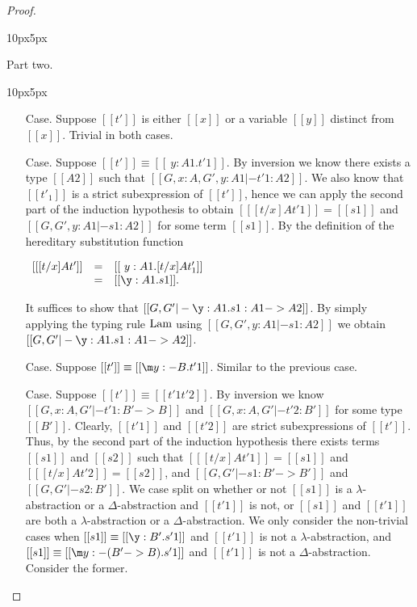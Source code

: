 \begin{proof}
\begin{changemargin}{10px}{5px}
\begin{itemize}
  \end{itemize}
  \end{changemargin}
  
  \noindent Part two.
  \vspace{-25px}
  \begin{changemargin}{10px}{5px}\noindent
  \begin{itemize}
  \item[Case.] Suppose $[[t']]$ is either $[[x]]$ or a variable $[[y]]$ distinct from $[[x]]$.  
    Trivial in both cases.

  \item[Case.] Suppose $[[t']] \equiv [[\ y:A1.t'1]]$.  By inversion 
    we know there exists a type $[[A2]]$ such that
    $[[G,x:A,G',y:A1 |- t'1:A2]]$.
    We also know that $[[t'_1]]$ is a strict subexpression of $[[t']]$, hence we can apply the second part of the
    induction hypothesis to obtain
    $[[ [t/x] A t'1]] = [[s1]]$ and $[[G,G',y:A1 |- s1:A2]]$
    for some term $[[s1]]$.  By the definition of the hereditary substitution function 
    \begin{center}
      \begin{math}
        \begin{array}{lll}
          [[ [t/x] A t']] & = & [[\ y:A1.[t/x] A t'_1]] \\
          & = & [[\y:A1.s1]].
        \end{array}
      \end{math}
    \end{center}
    It suffices to show that $[[G,G' |- \y:A1.s1:A1 -> A2]]$.  
    By simply applying the typing rule ${\normalfont\scriptsize \text{\normalsize Lam}}$ using
    $[[G,G',y:A1 |- s1:A2]]$ we obtain $[[G,G' |- \y:A1.s1:A1 -> A2]]$.
    
  \item[Case.] Suppose $[[t']] \equiv [[\m y:{-B}.t'1]]$.  Similar to the previous case.

  \item[Case.] Suppose $[[t']] \equiv [[t'1 t'2]]$.  By inversion we know
    $[[G, x:A, G' |- t'1 : B' -> B]]$ and
    $[[G, x:A, G' |- t'2 : B']]$ for some type $[[B']]$.
    Clearly, $[[t'1]]$ and $[[t'2]]$ are strict subexpressions of $[[t']]$.  Thus, by the second part of the
    induction hypothesis there exists terms $[[s1]]$ and $[[s2]]$ such that $[[ [t/x] A t'1]] = [[s1]]$ and
    $[[ [t/x] A t'2]] = [[s2]]$, and $[[G, G' |- s1 : B' -> B']]$ and
    $[[G, G' |- s2 : B']]$.  We case split on whether or not $[[s1]]$ is a $\lambda$-abstraction or
    a $\Delta$-abstraction and $[[t'1]]$ is not, or $[[s1]]$ and $[[t'1]]$ are both a $\lambda$-abstraction or
    a $\Delta$-abstraction.
    We only consider the non-trivial cases when $[[s1]] \equiv [[\y:B'.s'1]]$ and $[[t'1]]$ is not a 
    $\lambda$-abstraction, and $[[s1]] \equiv [[\m y:{-(B'->B)}.s'1]]$ and $[[t'1]]$ is not a 
    $\Delta$-abstraction.  Consider the former.
    

\end{itemize}
\end{changemargin}
\end{proof}
